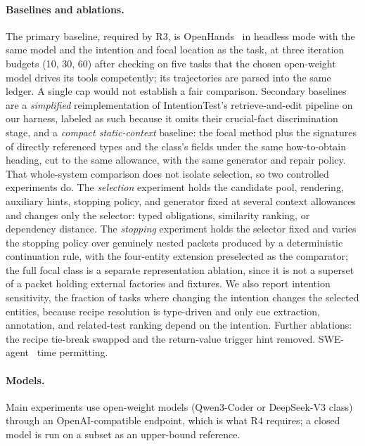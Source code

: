 \documentclass[sigconf,nonacm]{acmart}
\begin{document}
\paragraph{Baselines and ablations.}
The primary baseline, required by R3, is OpenHands~\cite{wang2025openhands} in headless mode with the same model and the intention and focal location as the task, at three iteration budgets (10, 30, 60) after checking on five tasks that the chosen open-weight model drives its tools competently; its trajectories are parsed into the same ledger. A single cap would not establish a fair comparison. Secondary baselines are a \emph{simplified} reimplementation of IntentionTest's retrieve-and-edit pipeline on our harness, labeled as such because it omits their crucial-fact discrimination stage, and a \emph{compact static-context} baseline: the focal method plus the signatures of directly referenced types and the class's fields under the same how-to-obtain heading, cut to the same allowance, with the same generator and repair policy. That whole-system comparison does not isolate selection, so two controlled experiments do. The \emph{selection} experiment holds the candidate pool, rendering, auxiliary hints, stopping policy, and generator fixed at several context allowances and changes only the selector: typed obligations, similarity ranking, or dependency distance. The \emph{stopping} experiment holds the selector fixed and varies the stopping policy over genuinely nested packets produced by a deterministic continuation rule, with the four-entity extension preselected as the comparator; the full focal class is a separate representation ablation, since it is not a superset of a packet holding external factories and fixtures. We also report intention sensitivity, the fraction of tasks where changing the intention changes the selected entities, because recipe resolution is type-driven and only cue extraction, annotation, and related-test ranking depend on the intention. Further ablations: the recipe tie-break swapped and the return-value trigger hint removed. SWE-agent~\cite{yang2024sweagent} time permitting.

\paragraph{Models.}
Main experiments use open-weight models (Qwen3-Coder or DeepSeek-V3 class) through an OpenAI-compatible endpoint, which is what R4 requires; a closed model is run on a subset as an upper-bound reference.
\end{document}
